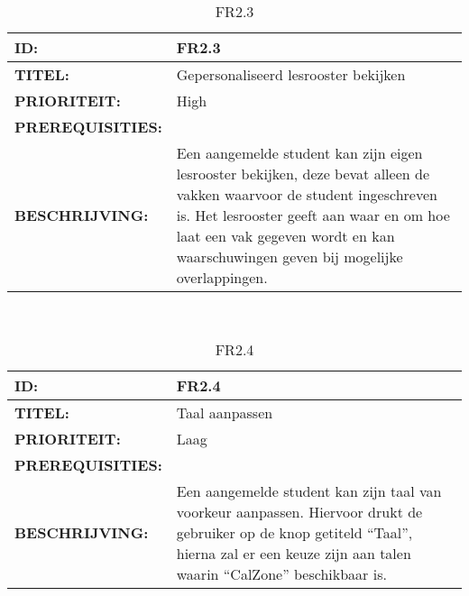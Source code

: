 
\noindent\begin{table}[h]
            \begin{tabular}{l | p{10cm}}
                \textbf{ID:} & FR2.3 \\ \hline
                \textbf{TITEL:} & Gepersonaliseerd lesrooster bekijken\\ \hline
                \textbf{PRIORITEIT:} &  High \\ \hline
                \textbf{PREREQUISITIES:} & \\ \hline
                \textbf{BESCHRIJVING:} & Een aangemelde student kan zijn eigen lesrooster bekijken, deze bevat alleen de vakken waarvoor de student ingeschreven is. 
                                        Het lesrooster geeft aan waar en om hoe laat een vak gegeven wordt en kan waarschuwingen geven bij mogelijke overlappingen.\\ 
            \end{tabular}\\
            \caption{FR2.3}
            \label{tab:myninthtable}
        \end{table}


\noindent\begin{table}[h]
            \begin{tabular}{l | p{10cm}}
                \textbf{ID:} & FR2.4 \\ \hline
                \textbf{TITEL:} & Taal aanpassen\\ \hline
                \textbf{PRIORITEIT:} &  Laag \\ \hline
                \textbf{PREREQUISITIES:} & \\ \hline
                \textbf{BESCHRIJVING:} & Een aangemelde student kan zijn taal van voorkeur aanpassen. 
                                        Hiervoor drukt de gebruiker op de knop getiteld “Taal”, hierna zal er een keuze zijn aan talen waarin “CalZone” beschikbaar is.\\ 
            \end{tabular}\\
            \caption{FR2.4}
            \label{tab:mytenthtable}
        \end{table}


